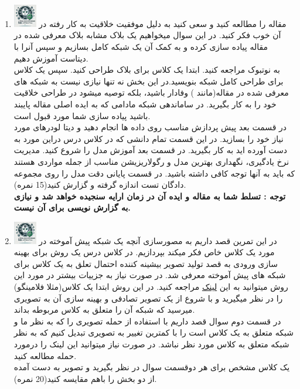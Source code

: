 \documentclass[12pt]{article}
\begin{document}
\begin{enumerate}
    \item \includegraphics[width=1cm]{figs/Allowed_recommended.jpg}
    مقاله \href{https://arxiv.org/pdf/1611.05431}{} را مطالعه کنید و سعی کنید به دلیل موفقیت خلاقیت به کار رفته در آن خوب فکر کنید. در این سوال میخواهیم یک بلاک مشابه بلاک معرفی شده در مقاله پیاده سازی کرده و به کمک آن یک شبکه کامل بسازیم و سپس آنرا با دیتاست  آموزش دهیم.\\
    به نوتبوک  مراجعه کنید. ابتدا یک کلاس برای بلاک  طراحی کنید. سپس یک کلاس برای طراحی کامل شبکه بنویسید.در این بخش نه تنها نیازی نیست به شبکه های معرفی شده در مقاله(مانند ) وفادار باشید، بلکه توصیه میشود در طراحی خلاقیت خود را به کار بگیرید. در ساماندهی شبکه مادامی که به ایده اصلی مقاله پایبند باشید پیاده سازی شما مورد قبول است.\\
    در قسمت بعد پیش پردازش مناسب روی داده ها انجام دهید و دیتا لودرهای مورد نیاز خود را بسازید. در این قسمت تمام دانشی که در کلاس درس دراین مورد به دست آورده اید به کار بگیرید. در قسمت بعد آموزش مدل را شروع کنید. مدیریت نرخ یادگیری، نگهداری بهترین مدل و رگولاریزیشن مناسب از جمله مواردی هستند که باید به آنها توجه کافی داشته باشید. در قسمت پایانی دقت مدل را روی مجموعه دادگان تست اندازه گرفته و گزارش کنید(15 نمره).\\
    \textbf{توجه : تسلط شما به مقاله و ایده آن در زمان ارایه سنجیده خواهد شد و نیازی به گزارش نویسی برای آن نیست.}
    
    \item \includegraphics[width=1cm]{figs/Allowed_recommended.jpg}
    در این تمرین قصد داریم به مصورسازی آنچه یک شبکه پیش آموخته در مورد یک کلاس خاص فکر میکند بپردازیم. در کلاس درس یک روش برای بهینه سازی ورودی به قصد تولید تصویر بیشینه کننده احتمال تعلق به یک کلاس برای شبکه های پیش آموخته معرفی شد. در صورت نیاز به جزییات بیشتر در مورد این روش میتوانید به این \href{https://yosinski.com/deepvis}{لینک} مراجعه کنید. در این روش ابتدا یک کلاس(مثلا فلامینگو) را در نظر میگیرید و با شروع از یک تصویر تصادفی و بهینه سازی آن به تصویری میرسید که شبکه آن را متعلق به کلاس مربوطه بداند.\\
    در قسمت دوم سوال قصد داریم با استفاده از حمله  تصویری را که به نظر ما و شبکه متعلق به یک کلاس است را با کمترین تغییر به تصویری تبدیل کنیم که به نظر شبکه متعلق به کلاس مورد نظر نباشد. در صورت نیاز میتوانید این لینک را درمورد حمله \href{https://medium.com/@zachariaharungeorge/a-deep-dive-into-the-fast-gradient-sign-method-611826e34865}{} مطالعه کنید.\\
    یک کلاس مشخص برای هر دوقسمت سوال در نظر بگیرید و تصویر به دست آمده از دو بخش را باهم مقایسه کنید(20 نمره).


\end{enumerate}
\end{document}
